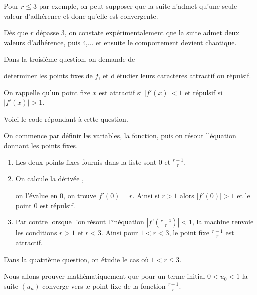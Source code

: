 Pour $r\leq 3$ par exemple, on peut supposer que la suite n'admet qu'une seule valeur d'adhérence et donc qu'elle est convergente.

Dès que $r$ dépasse $3$, on constate expérimentalement que la suite admet deux valeurs d'adhérence, puis $4$,... et ensuite le comportement devient chaotique.


\diapo

Dans la troisième question, on demande de 

déterminer les points fixes de $f$, et d'étudier leurs caractères attractif ou répulsif.

On rappelle qu'un point fixe $x$ est attractif si $|f'(x)|<1$ et répulsif si $|f'(x)|>1$.

\diapo

Voici le code répondant à cette question. 

On commence par définir les variables, la fonction, puis on résout l'équation donnant les points fixes.

\change

\begin{enumerate}
    \item Les deux points fixes fournis dans la liste 
    sont $0$ et $\frac{r-1}{r}$.

    \change 
    
    \item On calcule la dérivée , 

    on l'évalue en $0$, on trouve $f'(0)=r$. Ainsi si $r>1$ alors
    $|f'(0)|>1$ et le point $0$ est répulsif. 
    
    \change

    \item Par contre lorsque l'on résout l'inéquation $|f'(\frac{r-1}{r})|<1$, 
    la machine renvoie les conditions $r>1$ et $r < 3$. 
    Ainsi pour $1<r<3$, le point fixe $\frac{r-1}{r}$ est attractif.
    \end{enumerate}


\diapo

Dans la quatrième question, on étudie le cas où $1 < r \le3$. 

Nous allons prouver mathématiquement que pour un terme initial $0<u_0<1$ 
la suite $(u_n)$ converge vers le point fixe de la fonction $\frac{r-1}{r}$. 

